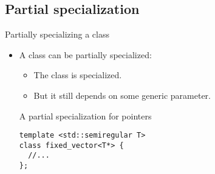 \subsection{Partial specialization}

\begin{frame}[t,fragile]{Partially specializing a class}
\begin{itemize}
  \item A class can be partially specialized:
    \begin{itemize}
      \item The class is specialized.
      \item But it still depends on some generic parameter.
    \end{itemize}

\begin{block}{A partial specialization for pointers}
\begin{lstlisting}
template <std::semiregular T>
class fixed_vector<T*> {
  //...
};
\end{lstlisting}
\end{block}

\end{itemize}
\end{frame}

